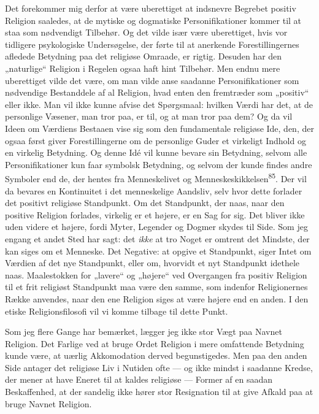 \documentclass[12pt,a4paper,openany]{book}
\newcommand{\opage}[1]{\marginnote{\footnotesize\textit{[#1]}}}
\begin{document}
Det forekommer mig derfor at være uberettiget at indsnevre Begrebet
positiv Religion saaledes, at de mytiske og dogmatiske Personifikationer
kommer til at staa som nødvendigt Tilbehør. Og det vilde især være
uberettiget, hvis vor tidligere psykologiske Undersøgelse, der førte til
at anerkende Forestillingernes afledede Betydning paa det religiøse
Omraade, er rigtig. Desuden har den „naturlige“ Religion i Regelen ogsaa
haft hint Tilbehør. Men endnu mere uberettiget vilde det være, om man
vilde anse saadanne Personifikationer som nødvendige Bestanddele af al
Religion, hvad enten den fremtræder som „positiv“ eller ikke. Man vil
ikke kunne afvise det Spørgsmaal: hvilken Værdi har det, at de
personlige Væsener, man tror paa, er til, og at man tror paa dem? Og da
vil Ideen om Værdiens Bestaaen vise sig som den fundamentale religiøse
Ide, den, der ogsaa først giver Forestillingerne om de personlige Guder
et virkeligt Indhold og en virkelig Betydning. Og denne Idé vil kunne
bevare sin Betydning, selvom alle Personifikationer kun faar symbolsk
Betydning, og selvom der kunde findes andre Symboler end de, der hentes
fra Menneskelivet og Menneskeskikkelsen\textsuperscript{85}. Der vil da
bevares en Kontinuitet i det menneskelige Aandsliv, selv hvor dette
forlader det
\opage{173}positivt religiøse Standpunkt. Om det Standpunkt, der naas,
naar den positive Religion forlades, virkelig er et højere, er en Sag
for sig. Det bliver ikke uden videre et højere, fordi Myter, Legender og
Dogmer skydes til Side. Som jeg engang et andet Sted har sagt: det
\textit{ikke} at tro Noget er omtrent det Mindste, der kan siges om et
Menneske. Det Negative: at opgive et Standpunkt, siger Intet om Værdien
af det nye Standpunkt, eller om, hvorvidt et nyt Standpunkt idethele
naas. Maalestokken for „lavere“ og „højere“ ved Overgangen fra positiv
Religion til et frit religiøst Standpunkt maa være den samme, som
indenfor Religionernes Række anvendes, naar den ene Religion siges at
være højere end en anden. I den etiske Religionsfilosofi vil vi komme
tilbage til dette Punkt.

Som jeg flere Gange har bemærket, lægger jeg ikke stor Vægt paa Navnet
Religion. Det Farlige ved at bruge Ordet Religion i mere omfattende
Betydning kunde være, at uærlig Akkomodation derved begunstigedes. Men
paa den anden Side antager det religiøse Liv i Nutiden ofte --- og ikke
mindst i saadanne Kredse, der mener at have Eneret til at kaldes
religiøse --- Former af en saadan Beskaffenhed, at der sandelig ikke
hører stor Resignation til at give Afkald paa at bruge Navnet Religion.
\end{document}
